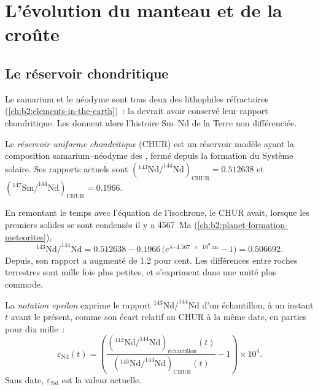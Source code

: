 \section{L'évolution du manteau et de la croûte}

\subsection{Le réservoir chondritique}

Le samarium et le néodyme sont tous deux des  lithophiles réfractaires
(\cref{ch:b2:elements-in-the-earth})~: la  devrait avoir conservé leur
rapport chondritique. Les  donnent alors l'histoire Sm--Nd de la Terre
non différenciée.

\begin{definition}\label{def:b2:isotope-geochemistry:chur}
Le \emph{réservoir uniforme chondritique}
(CHUR) est un réservoir modèle ayant la composition samarium--néodyme des ,
fermé depuis la formation du Système solaire. Ses rapports actuels sont
$(^{143}\mathrm{Nd}/^{144}\mathrm{Nd})_{\mathrm{CHUR}} = 0.512638$ et
$(^{147}\mathrm{Sm}/^{144}\mathrm{Nd})_{\mathrm{CHUR}} = 0.1966$.
\end{definition}

En remontant le temps avec l'équation de l'isochrone, le CHUR avait, lorsque les premiers solides se sont condensés il y a
\qty{4567}{Ma} (\cref{ch:b2:planet-formation-meteorites}),
\[
  ^{143}\mathrm{Nd}/^{144}\mathrm{Nd} = 0.512638 - 0.1966\,\bigl(e^{\lambda\cdot
  \num{4.567e9}\,\mathrm{an}}-1\bigr) = 0.506692 .
\] Depuis, son rapport a augmenté de
1.2 pour cent. Les différences entre roches terrestres sont mille fois
plus petites, et s'expriment dans une unité plus commode.

\begin{definition}\label{def:b2:isotope-geochemistry:epsilon}
La \emph{notation epsilon} exprime le
rapport $^{143}\mathrm{Nd}/^{144}\mathrm{Nd}$ d'un échantillon, à un instant $t$ avant le
présent, comme son écart relatif au CHUR à la même date, en parties pour dix
mille~:
\[
  \varepsilon_{\mathrm{Nd}}(t) = \left(
  \frac{(^{143}\mathrm{Nd}/^{144}\mathrm{Nd})_{\text{échantillon}}(t)}
       {(^{143}\mathrm{Nd}/^{144}\mathrm{Nd})_{\mathrm{CHUR}}(t)} - 1\right)\times 10^4 .
\]
Sans date, $\varepsilon_{\mathrm{Nd}}$ est la valeur actuelle.
\end{definition}


